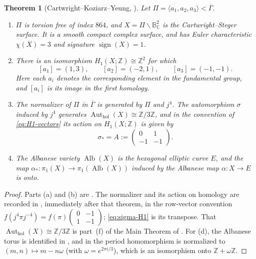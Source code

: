 \documentclass[11pt]{amsart}
\newtheorem{theorem}{Theorem}[section]
\theoremstyle{definition}
\theoremstyle{remark}
\newcommand{\Z}{\mathbb Z}
\newcommand{\C}{\mathbb C}
\newcommand{\B}{\mathbb B^2_{\C}}
\newcommand{\sgn}{\operatorname{sign}}
\newcommand{\GammaMax}{\overline\Gamma}
\newcommand{\PiCS}{\Pi}
\newcommand{\Alb}{\operatorname{Alb}}
\newcommand{\Aut}{\operatorname{Aut}}
\newcommand{\omegaE}{\omega}
\begin{document}
\begin{theorem}[Cartwright--Koziarz--Yeung, \cite{CKY}]\label{thm:CKY-input}
Let $\PiCS=\langle a_1,a_2,a_3\rangle<\GammaMax$.
\begin{enumerate}[label=\textup{(\alph*)}]
\item $\PiCS$ is torsion free of index $864$, and
  $X=\PiCS\backslash\B$ is the Cartwright--Steger surface.  It is a smooth
  compact complex surface, and has
      Euler characteristic $\chi(X)=3$ and signature $\sgn(X)=1$.
\item There is an isomorphism $H_1(X;\Z)\cong\Z^2$ for which
      \begin{equation}\label{eq:H1-vectors}
      [a_1]=(1,3),\qquad [a_2]=(-2,1),\qquad [a_3]=(-1,-1).
      \end{equation}
      Here each $a_i$ denotes the corresponding element in the
      fundamental group, and $[a_i]$ is its image in the first
      homology.
\item The normalizer of $\PiCS$ in $\GammaMax$ is generated by $\PiCS$
  and $j^4$.  The automorphism $\sigma$ induced by $j^4$ generates
  $\Aut_{\mathrm{hol}}(X)\cong\Z/3\Z$, and in the 
  convention of \eqref{eq:H1-vectors} its action on $H_1(X; \Z )$ is given by
      \begin{equation}\label{eq:sigma-H1}
      \sigma_*=A:=\begin{pmatrix}0&1\\-1&-1\end{pmatrix}.
      \end{equation}
    \item The Albanese variety $\Alb(X)$ is the hexagonal elliptic curve $E$,
      and the map $\alpha _*\colon \pi_1(X)\to\pi_1(\Alb(X))$ induced by the Albanese map
      $\alpha\colon X\to E$ is onto.
\end{enumerate}
\end{theorem}
\begin{proof}
Parts (a) and (b) are \cite[Theorem~2]{CKY}.  The normalizer and its
action on homology are recorded in \cite[\S1.4]{CKY}, immediately
after that theorem, in the row-vector convention $f(j^4\pi
j^{-4})=f(\pi)\left(\begin{smallmatrix}0&-1\\1&-1\end{smallmatrix}\right)$;
  \eqref{eq:sigma-H1} is its transpose.  That
  $\Aut_{\mathrm{hol}}(X)\cong\Z/3\Z$ is part~(f) of the Main Theorem of
  \cite{CKY}.  For (d), the Albanese torus is identified in
  \cite[Lemma~11]{CKY}, and in \cite[\S5.4]{CKY} the period
  homomorphism is normalized to $(m,n)\mapsto m-n\omegaE$ (with
  $\omegaE=e^{2\pi i/3}$), which is an
  isomorphism onto $\Z+\omegaE\Z$.
\end{proof}
\end{document}

